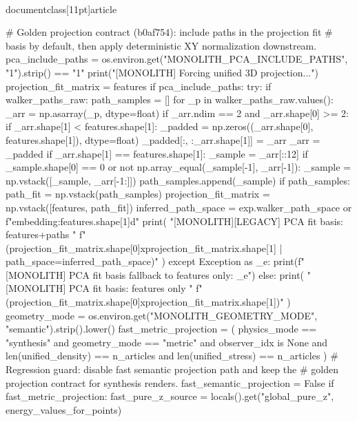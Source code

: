 \\documentclass[11pt]{article}
\begin{document}
\begin{CodeBlock}
{{{{{    # Golden projection contract (b0af754): include paths in the projection fit
    # basis by default, then apply deterministic XY normalization downstream.
    pca_include_paths = os.environ.get("MONOLITH_PCA_INCLUDE_PATHS", "1").strip() == "1"
    print("[MONOLITH] Forcing unified 3D projection...")
    projection_fit_matrix = features
    if pca_include_paths:
        try:
            if walker_paths_raw:
                path_samples = []
                for _p in walker_paths_raw.values():
                    _arr = np.asarray(_p, dtype=float)
                    if _arr.ndim == 2 and _arr.shape[0] >= 2:
                        if _arr.shape[1] < features.shape[1]:
                            _padded = np.zeros((_arr.shape[0], features.shape[1]), dtype=float)
                            _padded[:, :_arr.shape[1]] = _arr
                            _arr = _padded
                        if _arr.shape[1] == features.shape[1]:
                            _sample = _arr[::12]
                            if _sample.shape[0] == 0 or not np.array_equal(_sample[-1], _arr[-1]):
                                _sample = np.vstack([_sample, _arr[-1:]])
                            path_samples.append(_sample)
                if path_samples:
                    path_fit = np.vstack(path_samples)
                    projection_fit_matrix = np.vstack([features, path_fit])
                    inferred_path_space = exp.walker_path_space or f"embedding:{features.shape[1]}d"
                    print(
                        "[MONOLITH][LEGACY] PCA fit basis: features+paths "
                        f"({projection_fit_matrix.shape[0]}x{projection_fit_matrix.shape[1]} | path_space={inferred_path_space})"
                    )
        except Exception as _e:
            print(f"[MONOLITH] PCA fit basis fallback to features only: {_e}")
    else:
        print(
            "[MONOLITH] PCA fit basis: features only "
            f"({projection_fit_matrix.shape[0]}x{projection_fit_matrix.shape[1]})"
        )
    geometry_mode = os.environ.get("MONOLITH_GEOMETRY_MODE", "semantic").strip().lower()
    fast_metric_projection = (
        physics_mode == "synthesis"
        and geometry_mode == "metric"
        and observer_idx is None
        and len(unified_density) == n_articles
        and len(unified_stress) == n_articles
    )
    # Regression guard: disable fast semantic projection path and keep the
    # golden projection contract for synthesis renders.
    fast_semantic_projection = False
    if fast_metric_projection:
        fast_pure_z_source = locals().get("global_pure_z", energy_values_for_points)
}}}}}
\end{CodeBlock}
\end{document}
